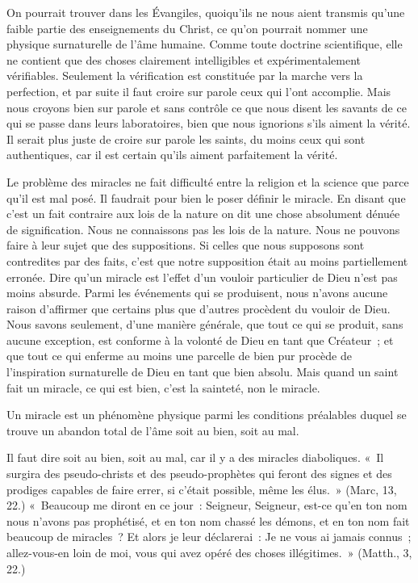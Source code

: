 \documentclass[french,twoside]{book} %
\begin{document}
On pourrait trouver dans les Évangiles, quoiqu'ils ne nous aient transmis qu'une faible partie des enseignements du Christ, ce qu'on pourrait nommer une physique surnaturelle de l'âme humaine. Comme toute doctrine scientifique, elle ne contient que des choses clairement intelligibles et expérimentalement vérifiables. Seulement la vérification est constituée par la marche vers la perfection, et par suite il faut croire sur parole ceux qui l'ont accomplie. Mais nous croyons bien sur parole et sans contrôle ce que nous disent les savants de ce qui se passe dans leurs laboratoires, bien que nous ignorions s'ils aiment la vérité. Il serait plus juste de croire sur parole les saints, du moins ceux qui sont authentiques, car il est certain qu'ils aiment parfaitement la vérité.\par
Le problème des miracles ne fait difficulté entre la religion et la science que parce qu'il est mal posé. Il faudrait pour bien le poser définir le miracle. En disant que c'est un fait contraire aux lois de la nature on dit une chose absolument dénuée de signification. Nous ne connaissons pas les lois de la nature. Nous ne pouvons faire à leur sujet que des suppositions. Si celles que nous supposons sont contredites par des faits, c'est que notre supposition était au moins partiellement erronée. Dire qu'un miracle est l'effet d'un vouloir particulier de Dieu n'est pas moins absurde. Parmi les événements qui se produisent, nous n'avons aucune raison d'affirmer que certains plus que d'autres procèdent du vouloir de Dieu. Nous savons seulement, d'une manière générale, que tout ce qui se produit, sans aucune exception, est conforme à la volonté de Dieu en tant que Créateur ; et que tout ce qui enferme au moins une parcelle de bien pur procède de l'inspiration surnaturelle de Dieu en tant que bien absolu. Mais quand un saint fait un miracle, ce qui est bien, c'est la sainteté, non le miracle.\par
Un miracle est un phénomène physique parmi les conditions préalables duquel se trouve un abandon total de l'âme soit au bien, soit au mal.\par
\par
Il faut dire soit au bien, soit au mal, car il y a des miracles diaboliques. « Il surgira des pseudo-christs et des pseudo-prophètes qui feront des signes et des prodiges capables de faire errer, si c'était possible, même les élus. » (Marc, 13, 22.) « Beaucoup me diront en ce jour : Seigneur, Seigneur, est-ce qu'en ton nom nous n'avons pas prophétisé, et en ton nom chassé les démons, et en ton nom fait beaucoup de miracles ? Et alors je leur déclarerai : Je ne vous ai jamais connus ; allez-vous-en loin de moi, vous qui avez opéré des choses illégitimes. » (Matth., 3, 22.)\par
\end{document}
